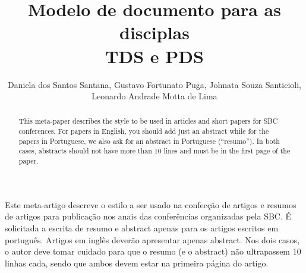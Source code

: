 \documentclass[
	article,			%
	12pt,				%
	oneside,			%
	a4paper,			%
	english,			%
	brazil,				%
	sumario=tradicional
	]{abntex2}
\title{Modelo de documento para as disciplas\\ TDS e PDS}
\author{Daniela dos Santos Santana\inst{1}, Gustavo Fortunato Puga\inst{2}, Johnata Souza Santicioli\inst{1},\\ Leonardo Andrade Motta de Lima\inst{3} }
\begin{document}


\frenchspacing 


%
%

\maketitle


\begin{abstract}
  This meta-paper describes the style to be used in articles and short papers
  for SBC conferences. For papers in English, you should add just an abstract
  while for the papers in Portuguese, we also ask for an abstract in
  Portuguese (``resumo''). In both cases, abstracts should not have more than
  10 lines and must be in the first page of the paper.
\end{abstract}
     
\begin{resumo1} 
  Este meta-artigo descreve o estilo a ser usado na confecção de artigos e
  resumos de artigos para publicação nos anais das conferências organizadas
  pela SBC. É solicitada a escrita de resumo e abstract apenas para os artigos
  escritos em português. Artigos em inglês deverão apresentar apenas abstract.
  Nos dois casos, o autor deve tomar cuidado para que o resumo (e o abstract)
  não ultrapassem 10 linhas cada, sendo que ambos devem estar na primeira
  página do artigo.
\end{resumo1}





\end{document}
